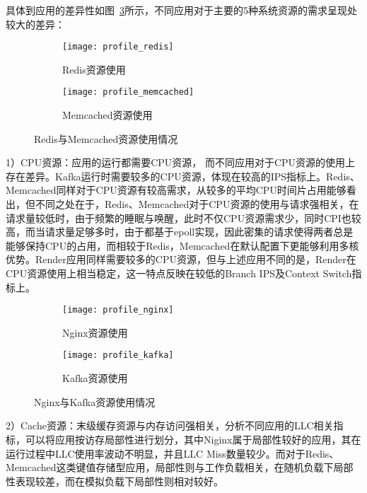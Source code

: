 具体到应用的差异性如图~\ref{fig:resource_affinity_0}所示，不同应用对于主要的5种系统资源的需求呈现处较大的差异：

\begin{figure}[H]
    \centering
    \begin{subfigure}[b]{0.9\textwidth}
      \texttt{[image: profile\_redis]}
      \caption{Redis资源使用}
      \label{fig:profile_redis}
    \end{subfigure}
    \begin{subfigure}[b]{0.9\textwidth}
        \texttt{[image: profile\_memcached]}
        \caption{Memcached资源使用}
        \label{fig:profile_memcached}
    \end{subfigure}
\caption{Redis与Memcached资源使用情况}
\label{fig:resource_affinity_0}
\end{figure}

1）CPU资源：应用的运行都需要CPU资源， 而不同应用对于CPU资源的使用上存在差异。Kafka运行时需要较多的CPU资源，体现在较高的IPS指标上。Redis、Memcached同样对于CPU资源有较高需求，从较多的平均CPU时间片占用能够看出，但不同之处在于，Redis、Memcached对于CPU资源的使用与请求强相关，在请求量较低时，由于频繁的睡眠与唤醒，此时不仅CPU资源需求少，同时CPI也较高，而当请求量足够多时，由于都基于epoll实现，因此密集的请求使得两者总是能够保持CPU的占用，而相较于Redis，Memcached在默认配置下更能够利用多核优势。Render应用同样需要较多的CPU资源，但与上述应用不同的是，Render在CPU资源使用上相当稳定，这一特点反映在较低的Branch IPS及Context Switch指标上。

\begin{figure}[H]
    \centering
    \begin{subfigure}[b]{0.9\textwidth}
      \texttt{[image: profile\_nginx]}
      \caption{Nginx资源使用}
      \label{fig:profile_nginx}
    \end{subfigure}
    \begin{subfigure}[b]{0.9\textwidth}
        \texttt{[image: profile\_kafka]}
        \caption{Kafka资源使用}
        \label{fig:profile_kafka}
    \end{subfigure}
\caption{Nginx与Kafka资源使用情况}
\label{fig:resource_affinity_1}
\end{figure}

2）Cache资源：末级缓存资源与内存访问强相关，分析不同应用的LLC相关指标，可以将应用按访存局部性进行划分，其中Niginx属于局部性较好的应用，其在运行过程中LLC使用率波动不明显，并且LLC Miss数量较少。而对于Redis、Memcached这类键值存储型应用，局部性则与工作负载相关，在随机负载下局部性表现较差，而在模拟负载下局部性则相对较好。

